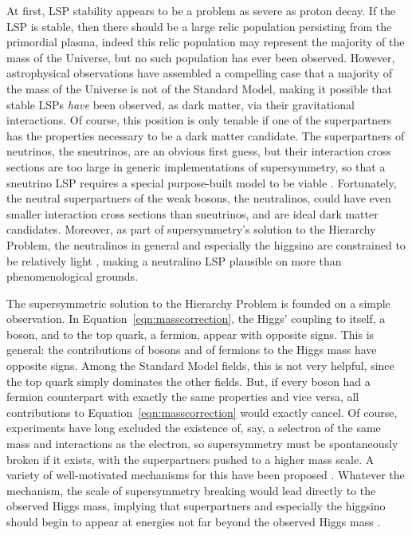   At first, LSP stability appears to be a problem as severe as proton decay.
  If the LSP is stable, then there should be a large relic population persisting from the primordial plasma, indeed this relic population may represent the majority of the mass of the Universe, but no such population has ever been observed.
  However, astrophysical observations have assembled a compelling case that a majority of the mass of the Universe is not of the Standard Model, making it possible that stable LSPs {\it have} been observed, as dark matter, via their gravitational interactions.
  Of course, this position is only tenable if one of the superpartners has the properties necessary to be a dark matter candidate.
  The superpartners of neutrinos, the sneutrinos, are an obvious first guess, but their interaction cross sections are too large in generic implementations of supersymmetry, so that a sneutrino LSP requires a special purpose-built model to be viable \cite{sneutrinos}.
  Fortunately, the neutral superpartners of the weak bosons, the neutralinos, could have even smaller interaction cross sections than sneutrinos, and are ideal dark matter candidates.
  Moreover, as part of supersymmetry's solution to the Hierarchy Problem, the neutralinos in general and especially the higgsino are constrained to be relatively light \cite{distracksAMSB, SUSYnaturalness, naturalWIMP}, making a neutralino LSP plausible on more than phenomenological grounds.

  The supersymmetric solution to the Hierarchy Problem is founded on a simple observation.
  In Equation~\ref{eqn:masscorrection}, the Higgs' coupling to itself, a boson, and to the top quark, a fermion, appear with opposite signs.
  This is general: the contributions of bosons and of fermions to the Higgs mass have opposite signs.
  Among the Standard Model fields, this is not very helpful, since the top quark simply dominates the other fields.
  But, if every boson had a fermion counterpart with exactly the same properties and vice versa, all contributions to Equation~\ref{eqn:masscorrection} would exactly cancel.
  Of course, experiments have long excluded the existence of, say, a selectron of the same mass and interactions as the electron, so supersymmetry must be spontaneously broken if it exists, with the superpartners pushed to a higher mass scale.
  A variety of well-motivated mechanisms for this have been proposed \cite{GMSB_theory,distracksAMSB}.
  Whatever the mechanism, the scale of supersymmetry breaking would lead directly to the observed Higgs mass, implying that superpartners and especially the higgsino should begin to appear at energies not far beyond the observed Higgs mass \cite{distracksAMSB,GMSB_theory,SUSYnaturalness,naturalWIMP}.


